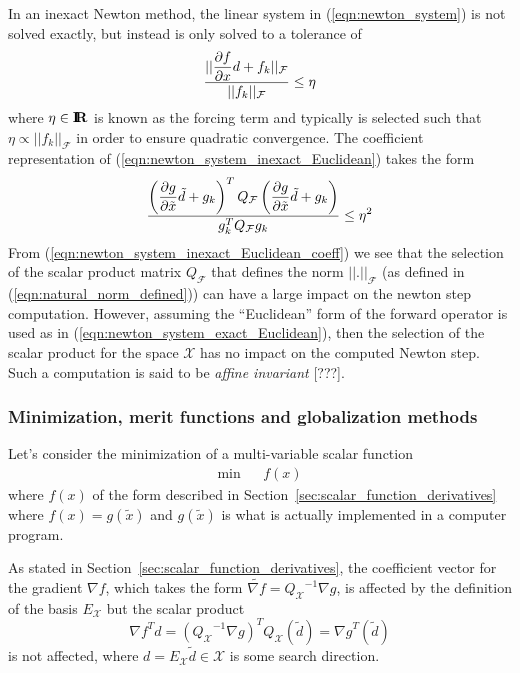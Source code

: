 In an inexact Newton method, the linear system in (\ref{eqn:newton_system}) is
not solved exactly, but instead is only solved to a tolerance of
%
\begin{equation}
\frac{||\displaystyle{\frac{\partial f}{\partial x}} d + f_k||_{\mathcal{F}}}{||f_k||_{\mathcal{F}}} \le \eta
\label{eqn:newton_system_inexact_Euclidean}
\end{equation}
%
where $\eta\in\mbox{\textbf{I}}\hspace{-0.6ex}\mbox{\textbf{R}}$ is known as the forcing term and typically is selected such
that $\eta {}\propto ||f_k||_{\mathcal{F}}$ in order to ensure quadratic
convergence.  The coefficient representation of
(\ref{eqn:newton_system_inexact_Euclidean}) takes the form
%
\begin{equation}
\frac{\left(\displaystyle{\frac{\partial g}{\partial \tilde{x}}} \tilde{d} + g_k\right)^T Q_{\mathcal{F}} \left(\displaystyle{\frac{\partial g}{\partial \tilde{x}}} \tilde{d} + g_k\right)}
{g_k^T Q_{\mathcal{F}} g_k} \le \eta^2
\label{eqn:newton_system_inexact_Euclidean_coeff}
\end{equation}
%
From (\ref{eqn:newton_system_inexact_Euclidean_coeff}) we see that the
selection of the scalar product matrix $Q_{\mathcal{F}}$ that defines the norm
$||.||_{\mathcal{F}}$ (as defined in (\ref{eqn:natural_norm_defined})) can
have a large impact on the newton step computation.  However, assuming the
``Euclidean'' form of the forward operator is used as in
(\ref{eqn:newton_system_exact_Euclidean}), then the selection of the scalar
product for the space $\mathcal{X}$ has no impact on the computed Newton step.
Such a computation is said to be {}\textit{affine invariant} [???].

\subsubsection{Minimization, merit functions and globalization methods}

Let's consider the minimization of a multi-variable scalar function
%
\begin{eqnarray}
\mbox{min} & & f(x)
\end{eqnarray}
%
where $f(x)$ of the form described in
Section~\ref{sec:scalar_function_derivatives} where $f(x) = g(\tilde{x})$ and
$g(\tilde{x})$ is what is actually implemented in a computer program.

As stated in Section~\ref{sec:scalar_function_derivatives}, the coefficient
vector for the gradient $\nabla f$, which takes the form $\tilde{\nabla f} =
{Q_{\mathcal{X}}}^{-1} {}\nabla g$, is affected by the definition of the basis
$E_{\mathcal{X}}$ but the scalar product
%
\begin{equation}
{\nabla f}^T d
= ({Q_{\mathcal{X}}}^{-1} {}\nabla g)^T Q_{\mathcal{X}} (\tilde{d})
 = {\nabla g}^T (\tilde{d})
\label{eqn:descent_inner_prod}
\end{equation}
%
is not affected, where $d=E_{\mathcal{X}}\tilde{d}\in\mathcal{X}$ is some
search direction.


